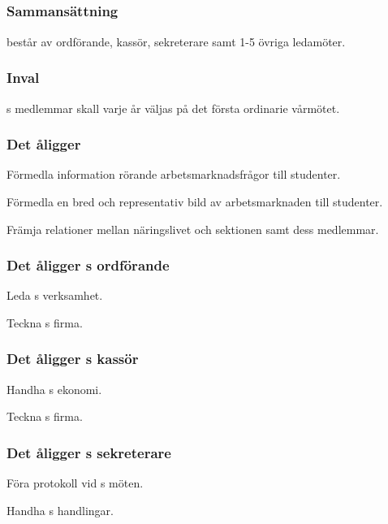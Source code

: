 \subsection{\ARMITFULL{}}
\subsubsection{Sammansättning}
\ARMIT{} består av ordförande, kassör, sekreterare samt 1-5 övriga ledamöter.

\subsubsection{Inval}
\ARMIT{}s medlemmar skall varje år väljas på det första ordinarie vårmötet.

\subsubsection{Det åligger \ARMIT{}}
\begin{att}
	\item Förmedla information rörande arbetsmarknadsfrågor till studenter.
	\item Förmedla en bred och representativ bild av arbetsmarknaden till studenter.
	\item Främja relationer mellan näringslivet och sektionen samt dess medlemmar.
\end{att}

\subsubsection{Det åligger \ARMIT{}s ordförande}
\begin{att}
	\item Leda \ARMIT{}s verksamhet.
	\item Teckna \ARMIT{}s firma.
\end{att}

\subsubsection{Det åligger \ARMIT{}s kassör}
\begin{att}
	\item Handha \ARMIT{}s ekonomi.
	\item Teckna \ARMIT{}s firma.
\end{att}

\subsubsection{Det åligger \ARMIT{}s sekreterare}
\begin{att}
	\item Föra protokoll vid \ARMIT{}s möten.
	\item Handha \ARMIT{}s handlingar.
\end{att}
